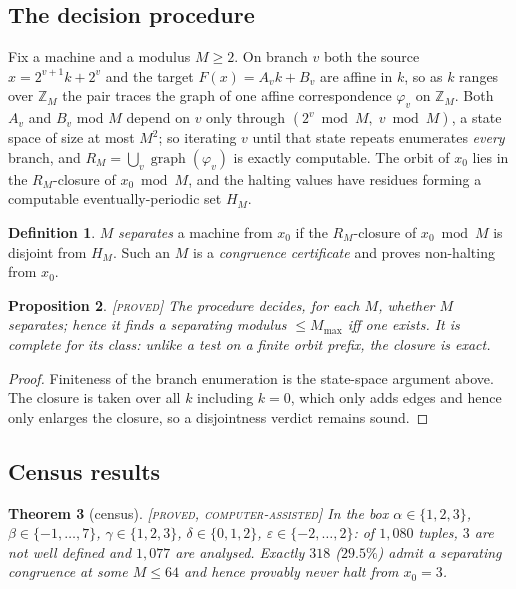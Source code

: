 \documentclass[11pt]{article}
\newtheorem{theorem}{Theorem}[section]
\newtheorem{proposition}[theorem]{Proposition}
\theoremstyle{definition}
\newtheorem{definition}[theorem]{Definition}
\theoremstyle{remark}
\newcommand{\Z}{\mathbb{Z}}
\newcommand{\Proved}{\textsc{[proved]}}
\newcommand{\CAP}{\textsc{[proved, computer-assisted]}}
\begin{document}
\subsection{The decision procedure}

Fix a machine and a modulus $M\ge2$.  On branch $v$ both the source
$x=2^{v+1}k+2^{v}$ and the target $F(x)=A_vk+B_v$ are affine in $k$, so as $k$
ranges over $\Z_M$ the pair traces the graph of one affine correspondence
$\varphi_v$ on $\Z_M$.  Both $A_v$ and $B_v$ mod $M$ depend on $v$ only
through $(2^{v}\bmod M,\;v\bmod M)$, a state space of size at most $M^2$; so
iterating $v$ until that state repeats enumerates \emph{every} branch, and
$R_M=\bigcup_v\operatorname{graph}(\varphi_v)$ is exactly computable.  The
orbit of $x_0$ lies in the $R_M$-closure of $x_0\bmod M$, and the halting
values have residues forming a computable eventually-periodic set $H_M$.

\begin{definition}
$M$ \emph{separates} a machine from $x_0$ if the $R_M$-closure of $x_0\bmod M$
is disjoint from $H_M$.  Such an $M$ is a \emph{congruence certificate} and
proves non-halting from $x_0$.
\end{definition}

\begin{proposition}\label{prop:exact}
\Proved{}\; The procedure decides, for each $M$, whether $M$ separates; hence
it finds a separating modulus $\le M_{\max}$ iff one exists.  It is complete
for its class: unlike a test on a finite orbit prefix, the closure is exact.
\end{proposition}

\begin{proof}
Finiteness of the branch enumeration is the state-space argument above.  The
closure is taken over all $k$ including $k=0$, which only adds edges and hence
only enlarges the closure, so a disjointness verdict remains sound.
\end{proof}

\subsection{Census results}

\begin{theorem}[census]\label{thm:census}
\CAP{}\; In the box $\alpha\in\{1,2,3\}$, $\beta\in\{-1,\dots,7\}$,
$\gamma\in\{1,2,3\}$, $\delta\in\{0,1,2\}$, $\varepsilon\in\{-2,\dots,2\}$:
of $1{,}080$ tuples, $3$ are not well defined and $1{,}077$ are analysed.
Exactly $318$ ($29.5\%$) admit a separating congruence at some $M\le 64$ and
hence provably never halt from $x_0=3$.
\end{theorem}
\end{document}
